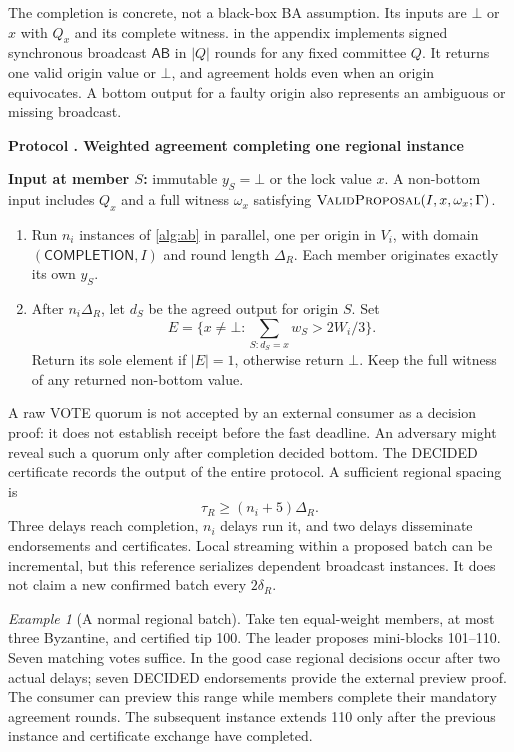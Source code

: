 \documentclass[11pt,a4paper,onecolumn]{article}
\newcommand{\AB}{\mathsf{AB}}
\newcommand{\botv}{\bot}
\newcommand{\Tag}[1]{\mathsf{#1}}
\newcommand{\Proc}[1]{\textnormal{\textsc{#1}}}
\theoremstyle{remark}\newtheorem{example}[definition]{Example}
\newcounter{protocol}
\newenvironment{protocol}[2]{\refstepcounter{protocol}\label{#1}\begin{mdframed}[nobreak=true,linewidth=.6pt,skipabove=10pt,skipbelow=10pt,innertopmargin=8pt,innerbottommargin=8pt]\small\raggedright\noindent\textbf{Protocol \theprotocol. #2}\par\smallskip}{\end{mdframed}}
\begin{document}
The completion is concrete, not a black-box BA assumption. Its inputs are
$\botv$ or $x$ with $Q_x$ and its complete witness.  in the appendix
implements signed synchronous broadcast $\AB$ in $|Q|$ rounds for any fixed
committee $Q$. It returns one valid origin value or $\botv$, and agreement
holds even when an origin equivocates. A bottom output for a faulty origin
also represents an ambiguous or missing broadcast.

\begin{protocol}{alg:ba}{Weighted agreement completing one regional instance}
\textbf{Input at member $S$:} immutable $y_S=\botv$ or the lock value $x$.
A non-bottom input includes $Q_x$ and a full witness $\omega_x$ satisfying
$\Proc{ValidProposal}(I,x,\omega_x;\Gamma)$.
\begin{enumerate}[label=\textbf{B\arabic*.}]
\item Run $n_i$ instances of \cref{alg:ab} in parallel, one per origin in $V_i$,
with domain $(\Tag{COMPLETION},I)$ and round length $\Delta_R$.
Each member originates exactly its own $y_S$.
\item After $n_i\Delta_R$, let $d_S$ be the agreed output for origin $S$.
Set
\[
 E=\{x\neq\botv:\textstyle\sum_{S:d_S=x}w_S>2W_i/3\}.
\]
Return its sole element if $|E|=1$, otherwise return $\botv$.
Keep the full witness of any returned non-bottom value.
\end{enumerate}
\end{protocol}

A raw VOTE quorum is not accepted by an external consumer as a decision proof:
it does not establish receipt before the fast deadline. An adversary might
reveal such a quorum only after completion decided bottom. The DECIDED
certificate records the output of the entire protocol.
A sufficient regional spacing is
\begin{equation}\label{eq:spacing}
 \tau_R\geq(n_i+5)\Delta_R.
\end{equation}
Three delays reach completion, $n_i$ delays run it, and two delays disseminate
endorsements and certificates. Local streaming within a proposed batch can be
incremental, but this reference serializes dependent broadcast instances.
It does not claim a new confirmed batch every $2\delta_R$.

\begin{example}[A normal regional batch]
Take ten equal-weight members, at most three Byzantine, and certified tip 100.
The leader proposes mini-blocks 101--110. Seven matching votes suffice. In the
good case regional decisions occur after two actual delays; seven DECIDED
endorsements provide the external preview proof. The consumer can preview this
range while members complete their mandatory agreement rounds. The subsequent
instance extends 110 only after the previous instance and certificate exchange
have completed.
\end{example}
\end{document}
